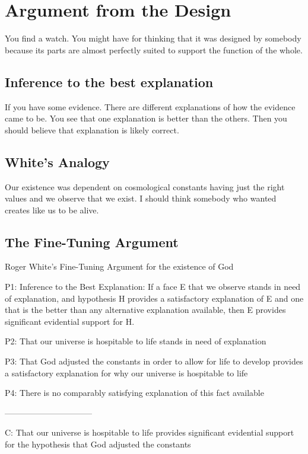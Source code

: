 \documentclass{book}
\begin{document}
\pagebreak

\section{Argument from the Design}

You find a watch. You might have for thinking that it was designed by somebody because its parts are almost perfectly suited to support the function of the whole.

\subsection{Inference to the best explanation}

If you have some evidence. There are different explanations of how the evidence came to be. You see that one explanation is better than the others. Then you should believe that explanation is likely correct.
\subsection{White's Analogy}

Our existence was dependent on cosmological constants having just the right values and we observe that we exist. I should think somebody who wanted creates like us to be alive.

\subsection{The Fine-Tuning Argument}
Roger White's Fine-Tuning Argument for the existence of God

P1: Inference to the Best Explanation: If a face E that we observe stands in need of explanation, and hypothesis H provides a satisfactory explanation of E and one that is the better than any alternative explanation available, then E provides significant evidential support for H.

P2: That our universe is hospitable to life stands in need of explanation

P3: That God adjusted the constants in order to allow for life to develop provides a satisfactory explanation for why our universe is hospitable to life

P4: There is no comparably satisfying explanation of this fact available

--------------------------------

C: That our universe is hospitable to life provides significant evidential support for the hypothesis that God adjusted the constants
\end{document}
